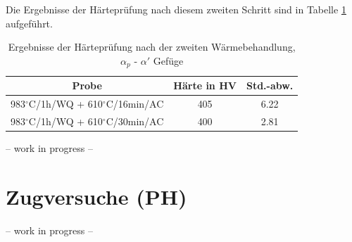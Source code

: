 Die Ergebnisse der Härteprüfung nach diesem zweiten Schritt sind in Tabelle \ref{Tabelle 9} aufgeführt.

\begin{table}[h]
	\centering
	\begin{tabular}{|c|c|c|}
		\hline 
		Probe & Härte in HV &  Std.-abw. \\ 
		\hline 
		983$^\circ$C/1h/WQ + 610$^\circ$C/16min/AC & 405 & 6.22 \\ 
		\hline 
		983$^\circ$C/1h/WQ + 610$^\circ$C/30min/AC & 400 & 2.81 \\ 
		\hline 
	\end{tabular} 
	\caption{Ergebnisse der Härteprüfung nach der zweiten Wärmebehandlung, $\alpha_p$ - $\alpha'$ Gefüge}
	\label{Tabelle 9}
\end{table}

-- work in progress --

\section{Zugversuche (PH)}

-- work in progress --